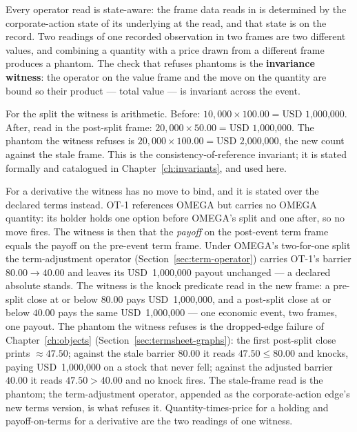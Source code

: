 \documentclass[11pt,a4paper]{article}
\newcommand{\USD}[1]{\mbox{USD~#1}}
\begin{document}
Every operator read is state-aware: the frame data reads in is determined by the
corporate-action state of its underlying at the read, and that state is on the record. Two
readings of one recorded observation in two frames are two different values, and combining a
quantity with a price drawn from a different frame produces a phantom. The check that
refuses phantoms is the \textbf{invariance witness}: the operator on the value frame and
the move on the quantity are bound so their product --- total value --- is invariant across
the event.

For the split the witness is arithmetic. Before: $10{,}000 \times 100.00 = \USD{1{,}000{,}000}$.
After, read in the post-split frame: $20{,}000 \times 50.00 = \USD{1{,}000{,}000}$. The
phantom the witness refuses is $20{,}000 \times 100.00 = \USD{2{,}000{,}000}$, the new count
against the stale frame. This is the consistency-of-reference invariant; it is stated
formally and catalogued in Chapter~\ref{ch:invariants}, and used here.

For a derivative the witness has no move to bind, and it is stated over the declared terms
instead. OT-1 references OMEGA but carries no OMEGA quantity: its holder holds one option
before OMEGA's split and one after, so no move fires. The witness is then that the
\emph{payoff} on the post-event term frame equals the payoff on the pre-event term frame.
Under OMEGA's two-for-one split the term-adjustment operator (Section~\ref{sec:term-operator})
carries OT-1's barrier $80.00 \rightarrow 40.00$ and leaves its \USD{1{,}000{,}000} payout
unchanged --- a declared absolute stands. The witness is the knock predicate read in the new
frame: a pre-split close at or below $80.00$ pays \USD{1{,}000{,}000}, and a post-split close
at or below $40.00$ pays the same \USD{1{,}000{,}000} --- one economic event, two frames, one
payout. The phantom the witness refuses is the dropped-edge failure of Chapter~\ref{ch:objects}
(Section~\ref{sec:termsheet-graphs}): the first post-split close prints $\approx 47.50$;
against the stale barrier $80.00$ it reads $47.50 \le 80.00$ and knocks, paying
\USD{1{,}000{,}000} on a stock that never fell; against the adjusted barrier $40.00$ it reads
$47.50 > 40.00$ and no knock fires. The stale-frame read is the phantom; the term-adjustment
operator, appended as the corporate-action edge's new terms version, is what refuses it.
Quantity-times-price for a holding and payoff-on-terms for a derivative are the two readings of
one witness.
\end{document}
